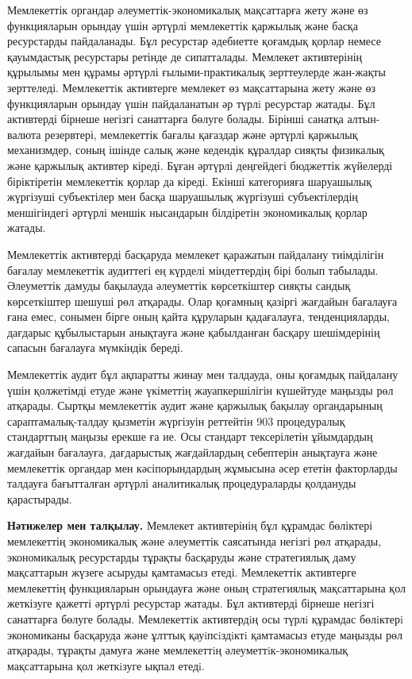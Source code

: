 {Мемлекеттік органдар әлеуметтік-экономикалық мақсаттарға жету және өз
функцияларын орындау үшін әртүрлі мемлекеттік қаржылық және басқа
ресурстарды пайдаланады. Бұл ресурстар әдебиетте қоғамдық қорлар немесе
қауымдастық ресурстары ретінде де сипатталады. Мемлекет активтерінің
құрылымы мен құрамы әртүрлі ғылыми-практикалық зерттеулерде жан-жақты
зерттеледі. Мемлекеттiк активтерге мемлекет өз мақсаттарына жету және өз
функцияларын орындау үшiн пайдаланатын әр түрлi ресурстар жатады. Бұл
активтерді бірнеше негізгі санаттарға бөлуге болады. Бірінші санатқа
алтын-валюта резервтері, мемлекеттік бағалы қағаздар және әртүрлі
қаржылық механизмдер, соның ішінде салық және кедендік құралдар сияқты
физикалық және қаржылық активтер кіреді. Бұған әртүрлі деңгейдегі
бюджеттік жүйелерді біріктіретін мемлекеттік қорлар да кіреді. Екінші
категорияға шаруашылық жүргізуші субъектілер мен басқа шаруашылық
жүргізуші субъектілердің меншігіндегі әртүрлі меншік нысандарын
білдіретін экономикалық қорлар жатады.

Мемлекеттік активтерді басқаруда мемлекет қаражатын пайдалану
тиімділігін бағалау мемлекеттік аудиттегі ең күрделі міндеттердің бірі
болып табылады. Әлеуметтік дамуды бақылауда әлеуметтік көрсеткіштер
сияқты сандық көрсеткіштер шешуші рөл атқарады. Олар қоғамның қазіргі
жағдайын бағалауға ғана емес, сонымен бірге оның қайта құруларын
қадағалауға, тенденцияларды, дағдарыс құбылыстарын анықтауға және
қабылданған басқару шешімдерінің сапасын бағалауға мүмкіндік береді.

Мемлекеттік аудит бұл ақпаратты жинау мен талдауда, оны қоғамдық
пайдалану үшін қолжетімді етуде және үкіметтің жауапкершілігін күшейтуде
маңызды рөл атқарады. Сыртқы мемлекеттік аудит және қаржылық бақылау
органдарының сараптамалық-талдау қызметін жүргізуін реттейтін 903
процедуралық стандарттың маңызы ерекше ға ие. Осы стандарт тексерілетін
ұйымдардың жағдайын бағалауға, дағдарыстық жағдайлардың себептерін
анықтауға және мемлекеттік органдар мен кәсіпорындардың жұмысына әсер
ететін факторларды талдауға бағытталған әртүрлі аналитикалық
процедураларды қолдануды қарастырады.

{\bfseries Нәтижелер мен талқылау.} Мемлекет активтерінің бұл құрамдас
бөліктері мемлекеттің экономикалық және әлеуметтік саясатында негізгі
рөл атқарады, экономикалық ресурстарды тұрақты басқаруды және
стратегиялық даму мақсаттарын жүзеге асыруды қамтамасыз етеді.
Мемлекеттік активтерге мемлекеттің функцияларын орындауға және оның
стратегиялық мақсаттарына қол жеткізуге қажетті әртүрлі ресурстар
жатады. Бұл активтерді бірнеше негізгі санаттарға бөлуге болады.
Мемлекеттiк активтердiң осы түрлi құрамдас бөлiктерi экономиканы
басқаруда және ұлттық қауiпсiздiктi қамтамасыз етуде маңызды рөл
атқарады, тұрақты дамуға және мемлекеттiң әлеуметтiк-экономикалық
мақсаттарына қол жеткiзуге ықпал етедi.

}
